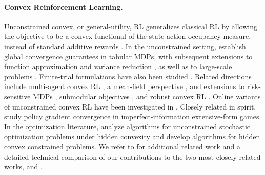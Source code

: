 \documentclass{article}
\theoremstyle{plain}
\theoremstyle{definition}
\theoremstyle{remark}
\begin{document}
\paragraph{Convex Reinforcement Learning.}
Unconstrained convex, or general-utility, RL generalizes classical RL by
allowing the objective to be a convex functional of the state-action
occupancy measure, instead of standard additive rewards
\cite{zahavyRewardEnoughConvex2021}. In the unconstrained setting,
\citet{zhangVariationalPolicyGradient2020} establish global convergence
guarantees in tabular MDPs, with subsequent extensions to function
approximation and variance reduction
\cite{zhangConvergenceSampleEfficiency2021,
 barakatReinforcementLearningGeneral2023a, santosNumberTrialsMatters2025a},
as well as to large-scale problems
\cite{huangOccupancybasedPolicyGradient2024,
 barakatScalableGeneralUtility2025}. Finite-trial formulations
\cite{muttiChallengingCommonAssumptions2022} have also been studied
\cite{muttiImportanceNonMarkovianityMaximum2022,
 muttiConvexReinforcementLearning2023}. Related directions include
multi-agent convex RL \cite{yingScalableMultiAgentReinforcement2023}, a
mean-field perspective \cite{geistConcaveUtilityReinforcement2022}, and
extensions to risk-sensitive MDPs \cite{wuRisksensitiveMarkovDecision2024},
submodular objectives \cite{prajapatSubmodularReinforcementLearning2023,
 desantiGlobalReinforcementLearning2024}, and robust convex RL
\cite{chenRobustReinforcementLearning2025}. Online variants of
unconstrained convex RL have been investigated in
\cite{morenoEfficientModelBasedConcave2024,
 marinmorenoMetaCURLNonstationaryConcave2024,
 morenoOnlineEpisodicConvex2025, barakatOnlineLearningHiddenConvex2026}.
Closely related in spirit,
\citet{kalogiannisLearningEquilibriaAdversarial2024} study policy gradient
convergence in imperfect-information extensive-form games. In the
optimization literature, \citet{fatkhullinStochasticOptimizationHidden2025}
analyze algorithms for unconstrained stochastic optimization problems under
hidden convexity and \citet{fatkhullinGlobalSolutionsNonConvex2025} develop
algorithms for hidden convex constrained problems. We refer to
 for additional related work and a
detailed technical comparison of our contributions to the two most closely
related works, \citet{zhangVariationalPolicyGradient2020} and
\citet{fatkhullinStochasticOptimizationHidden2025}.
\end{document}
